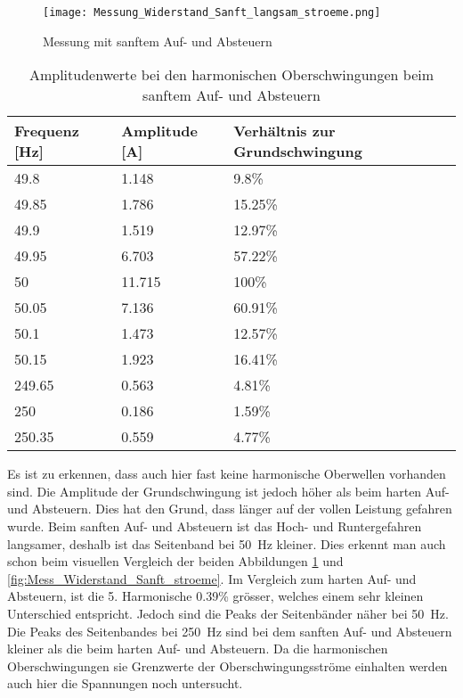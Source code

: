 \begin{figure}[ht!]
	\centering
	\texttt{[image: Messung\_Widerstand\_Sanft\_langsam\_stroeme.png]}	
	\caption{Messung mit sanftem Auf- und Absteuern}\label{fig:Mess_Widerstand_Sanft_langsam_stroeme}
\end{figure}

\begin{table}[ht!]
	\centering
	\begin{tabular}{|l|l|l|}
		\hline
		Frequenz {[}Hz{]} & Amplitude {[}A{]} & Verhältnis zur Grundschwingung	\\ \hline
		49.8              & 1.148             & 9.8\%							\\ \hline
		49.85             & 1.786             & 15.25\%							\\ \hline
		49.9              & 1.519             & 12.97\%							\\ \hline
		49.95             & 6.703             & 57.22\%							\\ \hline
		50                & 11.715            & 100\%							\\ \hline
		50.05             & 7.136             & 60.91\%							\\ \hline
		50.1              & 1.473             & 12.57\%							\\ \hline
		50.15             & 1.923             & 16.41\%							\\ \hline
		249.65            & 0.563             & 4.81\%							\\ \hline
		250               & 0.186             & 1.59\%							\\ \hline
		250.35            & 0.559             & 4.77\%							\\ \hline
	\end{tabular}
	\caption{Amplitudenwerte bei den harmonischen Oberschwingungen beim sanftem Auf- und Absteuern}\label{tab:Sanft_langsam_stroeme}
\end{table}
Es ist zu erkennen, dass auch hier fast keine harmonische Oberwellen vorhanden sind. Die Amplitude der Grundschwingung ist jedoch höher als beim harten Auf- und Absteuern. Dies hat den Grund, dass länger auf der vollen Leistung gefahren wurde. Beim sanften Auf- und Absteuern ist das Hoch- und Runtergefahren langsamer, deshalb ist das Seitenband bei \SI{50}{Hz} kleiner. Dies erkennt man auch schon beim visuellen Vergleich der beiden Abbildungen \ref{fig:Mess_Widerstand_Sanft_langsam_stroeme} und \ref{fig:Mess_Widerstand_Sanft_stroeme}. Im Vergleich zum harten Auf- und Absteuern, ist die 5. Harmonische 0.39\% grösser, welches einem sehr kleinen Unterschied entspricht. Jedoch sind die Peaks der Seitenbänder näher bei \SI{50}{Hz}. Die Peaks des Seitenbandes bei \SI{250}{Hz} sind bei dem sanften Auf- und Absteuern kleiner als die beim harten Auf- und Absteuern. Da die harmonischen Oberschwingungen sie Grenzwerte der Oberschwingungsströme einhalten werden auch hier die Spannungen noch untersucht. 




